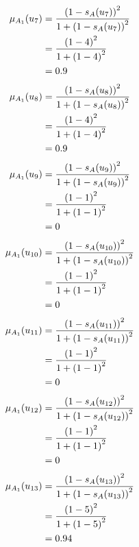 \documentclass[a4paper,openany]{book}
\begin{document}
				\begin{align}
					\mu_{A_1}(u_7) &= \frac{\left(1-s_A(u_7)\right)^2}{1 + \left(1-s_A(u_7)\right)^2}\\
					&= \frac{\left(1-4\right)^2}{1 + \left(1-4\right)^2} \notag \\
					&= 0.9 \notag
				\end{align}
				\begin{align}
					\mu_{A_1}(u_8) &= \frac{\left(1-s_A(u_8)\right)^2}{1 + \left(1-s_A(u_8)\right)^2}\\
					&= \frac{\left(1-4\right)^2}{1 + \left(1-4\right)^2} \notag \\
					&= 0.9 \notag
				\end{align}
				\begin{align}
					\mu_{A_1}(u_9) &= \frac{\left(1-s_A(u_9)\right)^2}{1 + \left(1-s_A(u_9)\right)^2}\\
					&= \frac{\left(1-1\right)^2}{1 + \left(1-1\right)^2} \notag \\
					&= 0 \notag
				\end{align}
				\begin{align}
					\mu_{A_1}(u_{10}) &= \frac{\left(1-s_A(u_{10})\right)^2}{1 + \left(1-s_A(u_{10})\right)^2}\\
					&= \frac{\left(1-1\right)^2}{1 + \left(1-1\right)^2} \notag \\
					&= 0 \notag
				\end{align}
				\begin{align}
					\mu_{A_1}(u_{11}) &= \frac{\left(1-s_A(u_{11})\right)^2}{1 + \left(1-s_A(u_{11})\right)^2}\\
					&= \frac{\left(1-1\right)^2}{1 + \left(1-1\right)^2} \notag \\
					&= 0 \notag
				\end{align}
				\begin{align}
					\mu_{A_1}(u_{12}) &= \frac{\left(1-s_A(u_{12})\right)^2}{1 + \left(1-s_A(u_{12})\right)^2}\\
					&= \frac{\left(1-1\right)^2}{1 + \left(1-1\right)^2} \notag \\
					&= 0 \notag
				\end{align}
				\begin{align}
					\mu_{A_1}(u_{13}) &= \frac{\left(1-s_A(u_{13})\right)^2}{1 + \left(1-s_A(u_{13})\right)^2}\\
					&= \frac{\left(1-5\right)^2}{1 + \left(1-5\right)^2} \notag \\
					&= 0.94 \notag
				\end{align}
\end{document}
